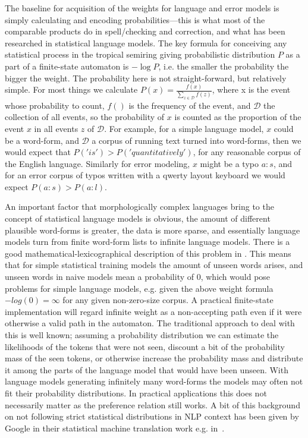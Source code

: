 \documentclass[officiallayout]{unihelcompling}
\begin{document}
The baseline for acquisition of the weights for language and error models is
simply calculating and encoding probabilities---this is what most of the
comparable products do in spell\-/checking and correction, and what has been
researched in statistical language models. The key formula for conceiving any
statistical process in the tropical semiring giving probabilistic distribution
$P$ as a part of a finite-state automaton is $-\log P$, i.e. the smaller the
probability the bigger the weight. The probability here is not
straight-forward, but relatively simple. For most things we calculate $P(x) =
\frac{f(x)}{\sum_{z \in \mathcal{D}} f(z)}$, where x is the event whose
probability to count, $f()$ is the frequency of the event, and $\mathcal{D}$
the collection of all events, so the probability of $x$ is counted as the
proportion of the event $x$ in all events $z$ of $\mathcal{D}$. For example,
for a simple language model, $x$ could be a word-form, and $\mathcal{D}$ a
corpus of running text turned into word-forms, then we would expect that
$P('is') > P('quantitatively')$, for any reasonable corpus of the English
language. Similarly for error modeling, $x$ might be a typo $a:s$, and for an
error corpus of typos written with a qwerty layout keyboard we would expect
$P(a:s) > P(a:l)$.

An important factor that morphologically complex languages bring to the concept
of statistical language models is obvious, the amount of different plausible
word-forms is greater, the data is more sparse, and essentially language models
turn from finite word-form lists to infinite language models.  There is a good
mathematical-lexicographical description of this problem in
\citep{kornai2002many}. This means that for simple statistical training models
the amount of unseen words arises, and unseen words in naive models mean a
probability of $0$, which would pose problems for simple language models, e.g.
given the above weight formula $-log(0) = \infty$ for any given non-zero-size
corpus. A practical finite-state implementation will regard infinite weight as
a non-accepting path even if it were otherwise a valid path in the automaton.
The traditional approach to deal with this is well known; assuming a
probability distribution we can estimate the likelihoods of the tokens that
were not seen, discount a bit of the probability mass of the seen tokens, or
otherwise increase the probability mass and distribute it among the parts of
the language model that would have been unseen. With language models generating
infinitely many word-forms the models may often not fit their probability
distributions. In practical applications this does not necessarily matter as
the preference relation still works. A bit of this background on not following
strict statistical distributions in NLP context has been given by Google in
their statistical machine translation work e.g.  in~\citet{brants2007large}.
\end{document}
